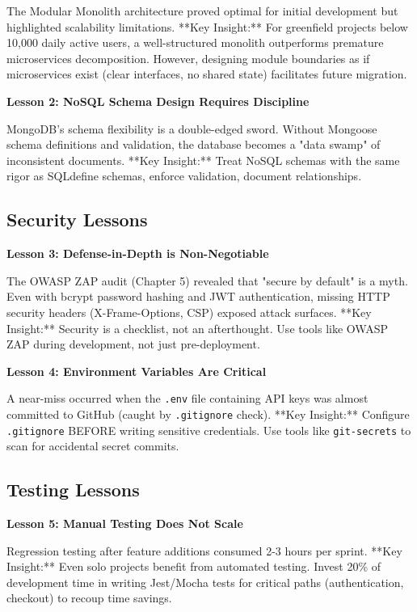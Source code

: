 \documentclass[12pt, a4paper]{report}
\begin{document}
The Modular Monolith architecture proved optimal for initial development but highlighted scalability limitations. **Key Insight:** For greenfield projects below 10,000 daily active users, a well-structured monolith outperforms premature microservices decomposition. However, designing module boundaries as if microservices exist (clear interfaces, no shared state) facilitates future migration.

\textbf{Lesson 2: NoSQL Schema Design Requires Discipline}

MongoDB's schema flexibility is a double-edged sword. Without Mongoose schema definitions and validation, the database becomes a "data swamp" of inconsistent documents. **Key Insight:** Treat NoSQL schemas with the same rigor as SQLdefine schemas, enforce validation, document relationships.

\subsection{Security Lessons}

\textbf{Lesson 3: Defense-in-Depth is Non-Negotiable}

The OWASP ZAP audit (Chapter 5) revealed that "secure by default" is a myth. Even with bcrypt password hashing and JWT authentication, missing HTTP security headers (X-Frame-Options, CSP) exposed attack surfaces. **Key Insight:** Security is a checklist, not an afterthought. Use tools like OWASP ZAP during development, not just pre-deployment.

\textbf{Lesson 4: Environment Variables Are Critical}

A near-miss occurred when the \texttt{.env} file containing API keys was almost committed to GitHub (caught by \texttt{.gitignore} check). **Key Insight:** Configure \texttt{.gitignore} BEFORE writing sensitive credentials. Use tools like \texttt{git-secrets} to scan for accidental secret commits.

\subsection{Testing Lessons}

\textbf{Lesson 5: Manual Testing Does Not Scale}

Regression testing after feature additions consumed 2-3 hours per sprint. **Key Insight:** Even solo projects benefit from automated testing. Invest 20\% of development time in writing Jest/Mocha tests for critical paths (authentication, checkout) to recoup time savings.
\end{document}
